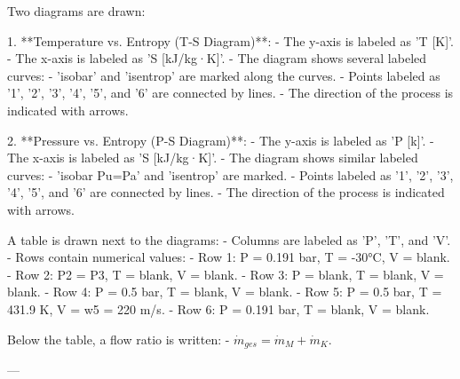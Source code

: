 Two diagrams are drawn:  

1. **Temperature vs. Entropy (T-S Diagram)**:  
   - The y-axis is labeled as 'T [K]'.  
   - The x-axis is labeled as 'S [kJ/kg·K]'.  
   - The diagram shows several labeled curves:  
     - 'isobar' and 'isentrop' are marked along the curves.  
     - Points labeled as '1', '2', '3', '4', '5', and '6' are connected by lines.  
     - The direction of the process is indicated with arrows.  

2. **Pressure vs. Entropy (P-S Diagram)**:  
   - The y-axis is labeled as 'P [k]'.  
   - The x-axis is labeled as 'S [kJ/kg·K]'.  
   - The diagram shows similar labeled curves:  
     - 'isobar Pu=Pa' and 'isentrop' are marked.  
     - Points labeled as '1', '2', '3', '4', '5', and '6' are connected by lines.  
     - The direction of the process is indicated with arrows.  

A table is drawn next to the diagrams:  
- Columns are labeled as 'P', 'T', and 'V'.  
- Rows contain numerical values:  
  - Row 1: P = 0.191 bar, T = -30°C, V = blank.  
  - Row 2: P2 = P3, T = blank, V = blank.  
  - Row 3: P = blank, T = blank, V = blank.  
  - Row 4: P = 0.5 bar, T = blank, V = blank.  
  - Row 5: P = 0.5 bar, T = 431.9 K, V = w5 = 220 m/s.  
  - Row 6: P = 0.191 bar, T = blank, V = blank.  

Below the table, a flow ratio is written:  
- \( \dot{m}_{ges} = \dot{m}_M + \dot{m}_K \).  

---
